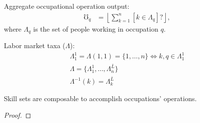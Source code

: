 \documentclass[hidelinks, nonatbib]{elsarticle}
\begin{document}
\begin{axiom}
    Aggregate occupational operation output:
    \begin{align}
        \mho_{q} 
        &= 
        \left\lfloor
        \sum_{k=1}^{n}
            [k \in {\Lambda}_q]
            ?
        \right\rfloor
        ,
    \end{align}
    where ${\Lambda}_q$ is the set of people working in occupation $q$.

    Labor market taxa ($\Lambda$):
    \begin{gather}
        \Lambda_{1}^{1}
        = \Lambda(1,1)
        = \{
            1, \dots, n
            \}
        \iff k, q \in 
        \Lambda_{1}^{1}
        \\
        \Lambda = \{
            \Lambda_{1}^{1},
            \dots,
            \Lambda_{n}^{\bar{L}}
            \}
        \\
        \Lambda^{-1}(k) = \Lambda_{k}^{\bar{L}}
    \end{gather}

\end{axiom}
\label{ocl}
\begin{lemma}
    Skill sets are composable to accomplish occupations' operations.
\end{lemma}

\begin{proof}

\end{proof}
\end{document}
